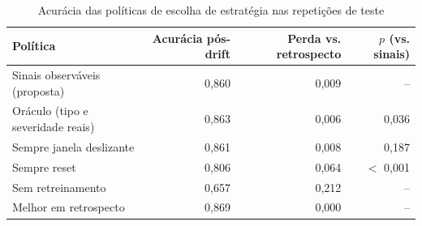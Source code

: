 \begin{table}[htbp]
\centering
\small
\caption{Acurácia das políticas de escolha de estratégia nas repetições de teste}
\label{tab:orientacao}
\begin{tabular}{lrrr}
\toprule
Política & Acurácia pós-drift & Perda vs. retrospecto & $p$ (vs. sinais) \\
\midrule
Sinais observáveis (proposta) & 0,860 & 0,009 & -- \\
Oráculo (tipo e severidade reais) & 0,863 & 0,006 & 0,036 \\
Sempre janela deslizante & 0,861 & 0,008 & 0,187 \\
Sempre reset & 0,806 & 0,064 & $<$ 0,001 \\
Sem retreinamento & 0,657 & 0,212 & -- \\
Melhor em retrospecto & 0,869 & 0,000 & -- \\
\bottomrule
\end{tabular}
\par\vspace{2pt}{\footnotesize 60 streams de teste $\times$ 3 classificadores; $p$: teste de Wilcoxon pareado contra a política baseada em sinais.}
\end{table}
